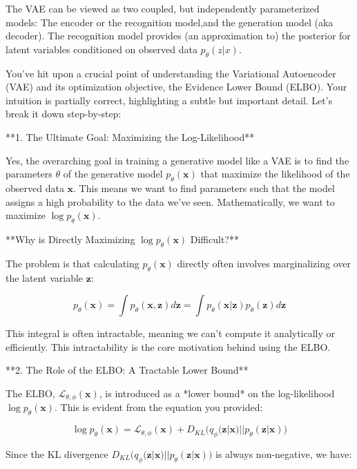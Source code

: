 \documentclass{article}
\begin{document}
\begin{definition}[VAE] The VAE can be viewed  as two coupled, but independently parameterized models: The encoder or the recognition model,and the generation model (aka decoder). The recognition model provides (an approximation to) the posterior for latent variables conditioned on observed data $p_{\theta}(z|x)$. 
\end{definition}


\newpage
You've hit upon a crucial point of understanding the Variational Autoencoder (VAE) and its optimization objective, the Evidence Lower Bound (ELBO). Your intuition is partially correct, highlighting a subtle but important detail. Let's break it down step-by-step:

**1. The Ultimate Goal: Maximizing the Log-Likelihood**

Yes, the overarching goal in training a generative model like a VAE is to find the parameters $\theta$ of the generative model $p_\theta(\mathbf{x})$ that maximize the likelihood of the observed data $\mathbf{x}$. This means we want to find parameters such that the model assigns a high probability to the data we've seen. Mathematically, we want to maximize $\log p_{\theta}(\mathbf{x})$.

**Why is Directly Maximizing $\log p_{\theta}(\mathbf{x})$ Difficult?**

The problem is that calculating $p_{\theta}(\mathbf{x})$ directly often involves marginalizing over the latent variable $\mathbf{z}$:

\[
p_{\theta}(\mathbf{x}) = \int p_{\theta}(\mathbf{x}, \mathbf{z}) d\mathbf{z} = \int p_{\theta}(\mathbf{x}|\mathbf{z}) p_{\theta}(\mathbf{z}) d\mathbf{z}
\]

This integral is often intractable, meaning we can't compute it analytically or efficiently. This intractability is the core motivation behind using the ELBO.

**2. The Role of the ELBO: A Tractable Lower Bound**

The ELBO, $\mathcal{L}_{\theta, \phi}(\bm{x})$, is introduced as a *lower bound* on the log-likelihood $\log p_{\theta}(\bm{x})$. This is evident from the equation you provided:

\[
\log p_{\theta}(\bm{x}) = \mathcal{L}_{\theta, \phi}(\bm{x}) + D_{KL} \big( q_{\phi}(\bm{z} | \bm{x}) || p_{\theta}(\bm{z} | \bm{x}) \big)
\]

Since the KL divergence $D_{KL} \big( q_{\phi}(\bm{z} | \bm{x}) || p_{\theta}(\bm{z} | \bm{x}) \big)$ is always non-negative, we have:
\end{document}
